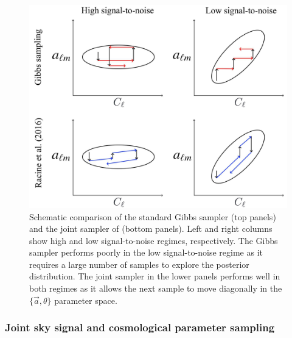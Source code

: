 \documentclass[twocolumn]{../common/aa}
\renewcommand{\a}[0]{\vec{a}}
\begin{document}
\begin{figure}
	\centering
	\includegraphics[width=\linewidth]{figures/parameter_degeneracy.jpg}
	\caption{\label{fig:illustration}Schematic comparison of the standard Gibbs sampler (top panels) and the joint sampler of \citet{racine:2016} (bottom panels). Left and right columns show high and low signal-to-noise regimes, respectively. The Gibbs sampler performs poorly in the low signal-to-noise regime as it requires a large number of samples to explore the posterior distribution. The joint sampler in the lower panels performs well in both regimes as it allows the next sample to move diagonally in the $\{\a, \theta\}$ parameter space.}
\end{figure}

\subsubsection{Joint sky signal and cosmological parameter sampling}
\label{sec:joint-sampling}
\end{document}
